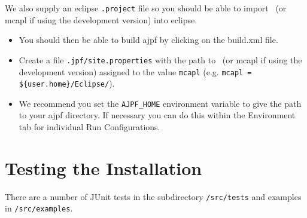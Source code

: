 We also supply an eclipse \texttt{.project} file so you should be able to import \ajpfversion\ (or mcapl if using the development version)  into eclipse.
\begin{itemize}
\item You should then be able to build ajpf by clicking on the build.xml file.
\item Create a file \texttt{.jpf/site.properties} with the path to \ajpfversion\ (or mcapl if using the development version)  assigned to the value \texttt{mcapl} (e.g. \texttt{mcapl = \$\{user.home\}/Eclipse/\ajpfversion}).
\item We recommend you set the \texttt{AJPF\_HOME} environment variable to give the path to your ajpf directory.  If necessary you can do this within the Environment tab for individual Run Configurations.
\end{itemize}

\section{Testing the Installation}

There are a number of JUnit tests in the subdirectory \texttt{/src/tests} and examples in \texttt{/src/examples}.

